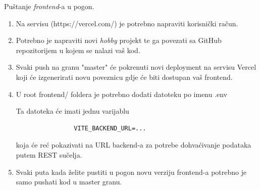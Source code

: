 		Puštanje \textit{frontend}-a u pogon. 
			
			
			\begin{enumerate}
				
			\item Na servisu (https://vercel.com/) je potrebno napraviti korisnički račun.
			
			\item Potrebno je napraviti novi \textit{hobby} projekt te ga povezati sa GitHub repozitorijem u kojem se nalazi vaš kod.
			
			\item Svaki push na granu "master" će pokrenuti novi deployment na servisu Vercel koji će izgenerirati novu poveznicu gdje će biti dostupan vaš frontend. 
			
			\item U root frontend/ foldera je potrebno dodati datoteku po imenu .env
			
			Ta datoteka će imati jednu varijablu 
			\begin{verbatim}
				VITE_BACKEND_URL=...
			\end{verbatim}
			koja će reć pokazivati na URL backend-a za potrebe dohvaćivanje podataka putem REST sučelja.
			
			\item Svaki puta kada želite pustiti u pogon novu verziju frontend-a potrebno je samo pushati kod u master granu.
				
			\end{enumerate}
			
			
			\eject 
